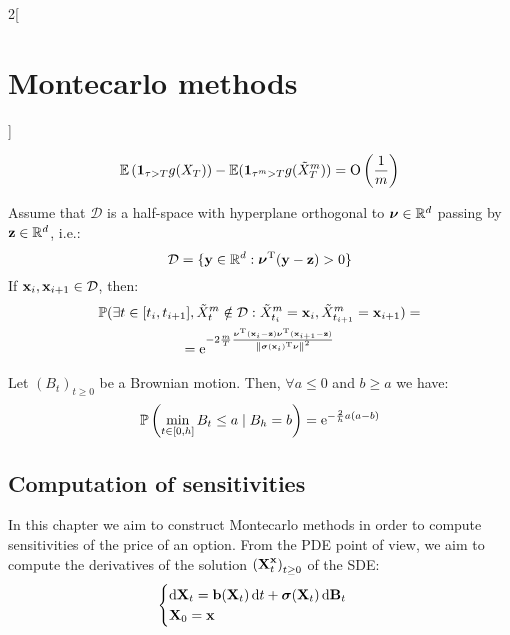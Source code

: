 \documentclass[../../../main_math.tex]{subfiles}
\begin{document}
\begin{multicols}{2}[\section{Montecarlo methods}]
\begin{proposition}
$$      \mathbb{E}\left(\boldsymbol{\mathrm{1}}_{\tau>T}g(X_T) \right)-\mathbb{E}(\boldsymbol{\mathrm{1}}_{\tau^m>T} g(\tilde{X}^m_T))=\mathrm{O}\left(\frac{1}{m}\right)
    $$
  \end{proposition}
  \begin{proposition}
    Assume that $\mathcal{D}$ is a half-space with hyperplane orthogonal to $\boldsymbol{\mathrm{\nu}}\in\mathbb{R}^d$ passing by $\boldsymbol{\mathrm{z}}\in\mathbb{R}^d$, i.e.:
    $$
      \mathcal{D}=\{ \boldsymbol{\mathrm{y}}\in\mathbb{R}^d : {\boldsymbol{\mathrm{\nu}}}^{\mathrm{T}}(\boldsymbol{\mathrm{y}}-\boldsymbol{\mathrm{z}})>0\}
    $$
    If $\boldsymbol{\mathrm{x}}_i,\boldsymbol{\mathrm{x}}_{i+1}\in \mathcal{D}$, then:
    \begin{multline*}
      \mathbb{P}(\exists t\in [t_i,t_{i+1}], \tilde{X}_t^m\notin\mathcal{D}:\tilde{X}_{t_i}^m=\boldsymbol{\mathrm{x}}_i, \tilde{X}_{t_{i+1}}^m=\boldsymbol{\mathrm{x}}_{i+1})=\\=\mathrm{e}^{
        -2\frac{m}{T}\frac{{\boldsymbol{\mathrm{\nu}}}^{\mathrm{T}}(\boldsymbol{\mathrm{x}}_{i}-\boldsymbol{\mathrm{z}}){\boldsymbol{\mathrm{\nu}}}^{\mathrm{T}}(\boldsymbol{\mathrm{x}}_{i+1}-\boldsymbol{\mathrm{z}})}{\left\|{\boldsymbol{\mathrm{\sigma}}(\boldsymbol{\mathrm{x}}_i)}^{\mathrm{T}}\boldsymbol{\mathrm{\nu}}\right\|^2}
      }
    \end{multline*}
  \end{proposition}
  \begin{lemma}
    Let ${(B_t)}_{t\geq 0}$ be a Brownian motion. Then, $\forall a\leq 0$ and $b\geq a$ we have:
    $$
      \mathbb{P}\left(\min_{t\in[0,h]}B_t\leq a\mid B_h=b\right)=\mathrm{e}^{-\frac{2}{h}a(a-b)}
    $$
  \end{lemma}
  \subsection{Computation of sensitivities}
  In this chapter we aim to construct Montecarlo methods in order to compute sensitivities of the price of an option. From the PDE point of view, we aim to compute the derivatives of the solution ${(\boldsymbol{\mathrm{X}}_t^{\boldsymbol{\mathrm{x}}})}_{t\geq 0}$ of the SDE:
  $$
    \begin{cases}
      \dd{\boldsymbol{\mathrm{X}}_t}=\boldsymbol{\mathrm{b}}(\boldsymbol{\mathrm{X}}_t)\dd{t}+\boldsymbol{\mathrm{\sigma}}(\boldsymbol{\mathrm{X}}_t)\dd{\boldsymbol{\mathrm{B}}_t} \\
      \boldsymbol{\mathrm{X}}_0=\boldsymbol{\mathrm{x}}
    \end{cases}
  $$

\end{multicols}
\end{document}
